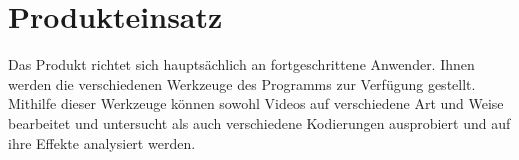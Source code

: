 \section{Produkteinsatz}

Das Produkt richtet sich hauptsächlich an fortgeschrittene Anwender. Ihnen werden die verschiedenen Werkzeuge des Programms zur Verfügung gestellt. Mithilfe dieser Werkzeuge können sowohl Videos auf verschiedene Art und Weise bearbeitet und untersucht als auch verschiedene Kodierungen ausprobiert und auf ihre Effekte analysiert werden.
